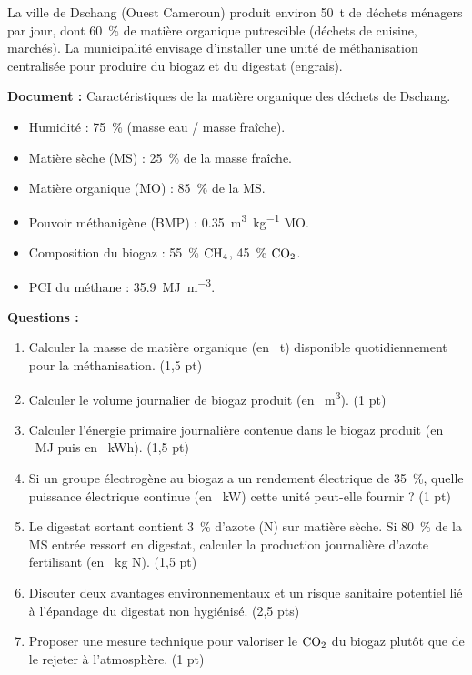 \documentclass[11pt]{article}
\begin{document}
\begin{exercice}
La ville de Dschang (Ouest Cameroun) produit environ \SI{50}{\tonne} de déchets ménagers par jour, dont \SI{60}{\%} de matière organique putrescible (déchets de cuisine, marchés). La municipalité envisage d'installer une unité de méthanisation centralisée pour produire du biogaz et du digestat (engrais).

\textbf{Document :} Caractéristiques de la matière organique des déchets de Dschang.
\begin{itemize}
\item Humidité : \SI{75}{\%} (masse eau / masse fraîche).
\item Matière sèche (MS) : \SI{25}{\%} de la masse fraîche.
\item Matière organique (MO) : \SI{85}{\%} de la MS.
\item Pouvoir méthanigène (BMP) : \SI{0,35}{\cubic\meter\per\kg} MO.
\item Composition du biogaz : \SI{55}{\%} $\ce{CH4}$, \SI{45}{\%} $\ce{CO2}$.
\item PCI du méthane : \SI{35,9}{\mega\joule\per\cubic\meter}.
\end{itemize}

\textbf{Questions :}
\begin{enumerate}
\item Calculer la masse de matière organique (en \SI{}{\tonne}) disponible quotidiennement pour la méthanisation. (1,5 pt)
\item Calculer le volume journalier de biogaz produit (en \SI{}{\cubic\meter}). (1 pt)
\item Calculer l'énergie primaire journalière contenue dans le biogaz produit (en \SI{}{\mega\joule} puis en \SI{}{\kWh}). (1,5 pt)
\item Si un groupe électrogène au biogaz a un rendement électrique de \SI{35}{\%}, quelle puissance électrique continue (en \SI{}{\kW}) cette unité peut-elle fournir ? (1 pt)
\item Le digestat sortant contient \SI{3}{\%} d'azote (N) sur matière sèche. Si \SI{80}{\%} de la MS entrée ressort en digestat, calculer la production journalière d'azote fertilisant (en \SI{}{\kg} N). (1,5 pt)
\item Discuter deux avantages environnementaux et un risque sanitaire potentiel lié à l'épandage du digestat non hygiénisé. (2,5 pts)
\item Proposer une mesure technique pour valoriser le $\ce{CO2}$ du biogaz plutôt que de le rejeter à l'atmosphère. (1 pt)
\end{enumerate}
\end{exercice}
\end{document}
